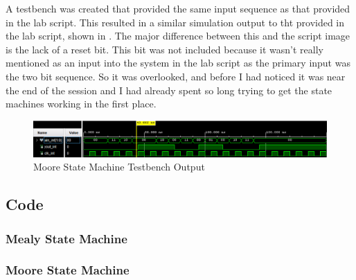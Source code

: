 \documentclass[a4paper, 12pt]{article}
\begin{document}
			\par
			A testbench was created that provided the same input sequence as that provided in the lab script. This resulted in a similar simulation output to tht provided in the lab script, shown in . The major difference between this and the script image is the lack of a reset bit. This bit was not included because it wasn't really mentioned as an input into the system in the lab script as the primary input was the two bit sequence. So it was overlooked, and before I had noticed it was near the end of the session and I had already spent so long trying to get the state machines working in the first place.
			\begin{figure}[!ht]
				\centering
				\includegraphics[width=\columnwidth]{moore.png}
				\caption{Moore State Machine Testbench Output}
				\label{fig:moore}
			\end{figure}
		\subsection{Code}
			\subsubsection{Mealy State Machine}
				
				

			\subsubsection{Moore State Machine}
				
				

\end{document}
